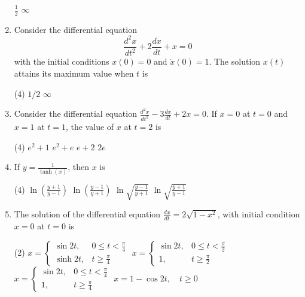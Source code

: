 \begin{enumerate}[label=\color{ocre}\textbf{\arabic*.}]
\begin{tasks}
		\task[\textbf{C.}] $\frac{1}{2}$
		\task[\textbf{D.}] $\infty$
	\end{tasks}
	\item Consider the differential equation
	$$
	\frac{d^{2} x}{d t^{2}}+2 \frac{d x}{d t}+x=0
	$$
	with the initial conditions $x(0)=0$ and $\dot{x}(0)=1$. The solution $x(t)$ attains its maximum value when $t$ is
	{}
	\begin{tasks}(4)
		\task[\textbf{A.}] $1 / 2$
		\task[\textbf{D.}] $\infty$
	\end{tasks}
	\item Consider the differential equation $\frac{d^{2} x}{d t^{2}}-3 \frac{d x}{d t}+2 x=0$. If $x=0$ at $t=0$ and $x=1$ at $t=1$, the value of $x$ at $t=2$ is
	{}
	\begin{tasks}(4)
		\task[\textbf{A.}] $e^{2}+1$
		\task[\textbf{B.}] $e^{2}+e$
		\task[\textbf{C.}] $e+2$
		\task[\textbf{D.}] $2 e$
	\end{tasks}
	\item  If $y=\frac{1}{\tanh (x)}$, then $x$ is
	{}
	\begin{tasks}(4)
		\task[\textbf{A.}] $\ln \left(\frac{y+1}{y-1}\right)$
		\task[\textbf{B.}] $\ln \left(\frac{y-1}{y+1}\right)$
		\task[\textbf{C.}]  $\ln \sqrt{\frac{y-1}{y+1}}$
		\task[\textbf{D.}]  $\ln \sqrt{\frac{y+1}{y-1}}$
	\end{tasks}
	\item The solution of the differential equation $\frac{d x}{d t}=2 \sqrt{1-x^{2}}$, with initial condition $x=0$ at $t=0$ is
	{}
	\begin{tasks}(2)
		\task[\textbf{A.}] $x=\left\{\begin{array}{ll}\sin 2 t, & 0 \leq t<\frac{\pi}{4} \\ \sinh 2 t, & t \geq \frac{\pi}{4}\end{array}\right.$
		\task[\textbf{B.}] $x=\left\{\begin{array}{cc}\sin 2 t, & 0 \leq t<\frac{\pi}{2} \\ 1, & t \geq \frac{\pi}{2}\end{array}\right.$
		\task[\textbf{C.}] $x=\left\{\begin{array}{cc}\sin 2 t, & 0 \leq t<\frac{\pi}{4} \\ 1, & t \geq \frac{\pi}{4}\end{array}\right.$
		\task[\textbf{D.}] $x=1-\cos 2 t, \quad t \geq 0$

\end{tasks}
\end{enumerate}
